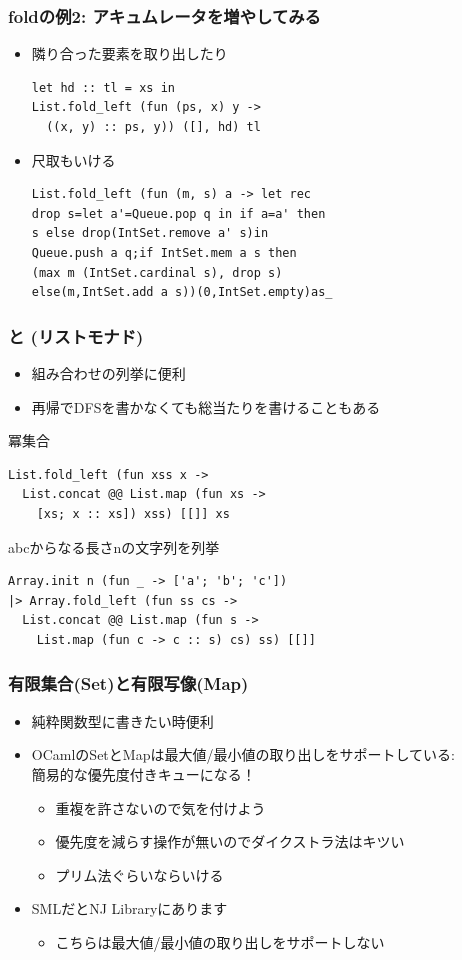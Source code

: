 \documentclass[dvipdfmx,cjk,xcolor=dvipsnames,envcountsect,notheorems,12pt]{beamer}
\theoremstyle{definition}
\begin{document}
\begin{frame}[fragile]
	\frametitle{foldの例2: アキュムレータを増やしてみる}
	\begin{itemize}
		\item 隣り合った要素を取り出したり
			\begin{lstlisting}
let hd :: tl = xs in
List.fold_left (fun (ps, x) y ->
  ((x, y) :: ps, y)) ([], hd) tl
\end{lstlisting}

		\item 尺取もいける
			\begin{lstlisting}
List.fold_left (fun (m, s) a -> let rec
drop s=let a'=Queue.pop q in if a=a' then
s else drop(IntSet.remove a' s)in
Queue.push a q;if IntSet.mem a s then
(max m (IntSet.cardinal s), drop s)
else(m,IntSet.add a s))(0,IntSet.empty)as_
\end{lstlisting}
	\end{itemize}
\end{frame}

\begin{frame}[fragile]
	\frametitle{と (リストモナド)}
	\begin{itemize}
		\item 組み合わせの列挙に便利
		\item 再帰でDFSを書かなくても総当たりを書けることもある
	\end{itemize}
	冪集合
	\begin{lstlisting}
List.fold_left (fun xss x ->
  List.concat @@ List.map (fun xs ->
    [xs; x :: xs]) xss) [[]] xs
\end{lstlisting}
	abcからなる長さnの文字列を列挙
	\begin{lstlisting}
Array.init n (fun _ -> ['a'; 'b'; 'c'])
|> Array.fold_left (fun ss cs ->
  List.concat @@ List.map (fun s ->
    List.map (fun c -> c :: s) cs) ss) [[]]
\end{lstlisting}
\end{frame}

\begin{frame}
	\frametitle{有限集合(Set)と有限写像(Map)}
	\begin{itemize}
		\item 純粋関数型に書きたい時便利
		\item OCamlのSetとMapは最大値/最小値の取り出しをサポートしている:\\
			簡易的な優先度付きキューになる！
			\begin{itemize}
				\item 重複を許さないので気を付けよう
				\item 優先度を減らす操作が無いのでダイクストラ法はキツい
				\item プリム法ぐらいならいける
			\end{itemize}
		\item SMLだとNJ Libraryにあります
			\begin{itemize}
				\item こちらは最大値/最小値の取り出しをサポートしない
			\end{itemize}
	\end{itemize}
\end{frame}
\end{document}
